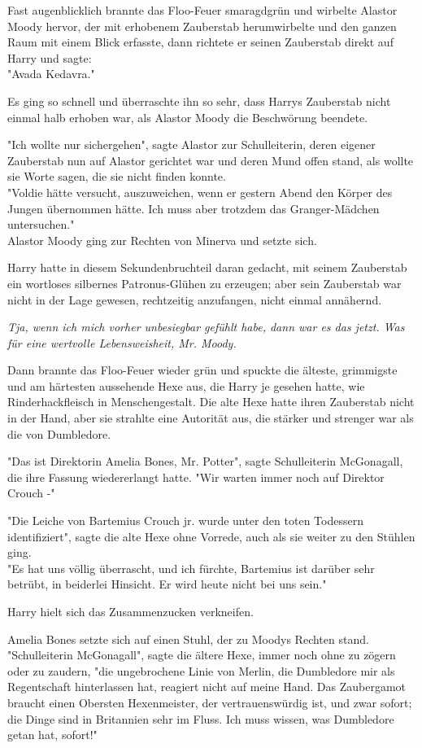{Fast augenblicklich brannte das Floo-Feuer smaragdgrün und wirbelte Alastor Moody hervor, der mit erhobenem Zauberstab herumwirbelte und den ganzen Raum mit einem Blick erfasste, dann richtete er seinen Zauberstab direkt auf Harry und sagte:\\ "Avada Kedavra."

Es ging so schnell und überraschte ihn so sehr, dass Harrys Zauberstab nicht einmal halb erhoben war, als Alastor Moody die Beschwörung beendete.

"Ich wollte nur sichergehen", sagte Alastor zur Schulleiterin, deren eigener Zauberstab nun auf Alastor gerichtet war und deren Mund offen stand, als wollte sie Worte sagen, die sie nicht finden konnte.\\ "Voldie hätte versucht, auszuweichen, wenn er gestern Abend den Körper des Jungen übernommen hätte. Ich muss aber trotzdem das Granger-Mädchen untersuchen."\\ Alastor Moody ging zur Rechten von Minerva und setzte sich.

Harry hatte in diesem Sekundenbruchteil daran gedacht, mit seinem Zauberstab ein wortloses silbernes Patronus-Glühen zu erzeugen; aber sein Zauberstab war nicht in der Lage gewesen, rechtzeitig anzufangen, nicht einmal annähernd.

\emph{Tja, wenn ich mich vorher unbesiegbar gefühlt habe, dann war es das jetzt. Was für eine wertvolle Lebensweisheit, Mr. Moody.}

Dann brannte das Floo-Feuer wieder grün und spuckte die älteste, grimmigste und am härtesten aussehende Hexe aus, die Harry je gesehen hatte, wie Rinderhackfleisch in Menschengestalt. Die alte Hexe hatte ihren Zauberstab nicht in der Hand, aber sie strahlte eine Autorität aus, die stärker und strenger war als die von Dumbledore.

"Das ist Direktorin Amelia Bones, Mr. Potter", sagte Schulleiterin McGonagall, die ihre Fassung wiedererlangt hatte. "Wir warten immer noch auf Direktor Crouch -"

"Die Leiche von Bartemius Crouch jr. wurde unter den toten Todessern identifiziert", sagte die alte Hexe ohne Vorrede, auch als sie weiter zu den Stühlen ging.\\ "Es hat uns völlig überrascht, und ich fürchte, Bartemius ist darüber sehr betrübt, in beiderlei Hinsicht. Er wird heute nicht bei uns sein."

Harry hielt sich das Zusammenzucken verkneifen.

Amelia Bones setzte sich auf einen Stuhl, der zu Moodys Rechten stand.\\ "Schulleiterin McGonagall", sagte die ältere Hexe, immer noch ohne zu zögern oder zu zaudern, "die ungebrochene Linie von Merlin, die Dumbledore mir als Regentschaft hinterlassen hat, reagiert nicht auf meine Hand. Das Zaubergamot braucht einen Obersten Hexenmeister, der vertrauenswürdig ist, und zwar sofort; die Dinge sind in Britannien sehr im Fluss. Ich muss wissen, was Dumbledore getan hat, sofort!"

}
